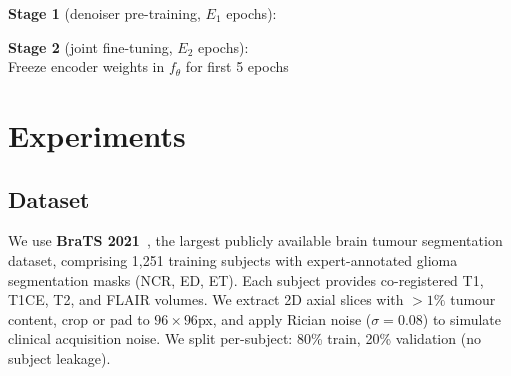 \documentclass[runningheads]{llncs}
\begin{document}
\begin{algorithm}[tb]
\SetAlgoLined
{}

\textbf{Stage 1} (denoiser pre-training, $E_1$ epochs):\\

\textbf{Stage 2} (joint fine-tuning, $E_2$ epochs):\\
Freeze encoder weights in $f_\theta$ for first 5 epochs\;
\caption{PP-MAE Two-Stage Training}
\label{alg:train}
\end{algorithm}


\section{Experiments}
\label{sec:experiments}

\subsection{Dataset}

We use \textbf{BraTS 2021}~\cite{brats2021}, the largest publicly available
brain tumour segmentation dataset, comprising 1,251 training subjects with
expert-annotated glioma segmentation masks (NCR, ED, ET).
Each subject provides co-registered T1, T1CE, T2, and FLAIR volumes.
We extract 2D axial slices with $>1\%$ tumour content,
crop or pad to $96 \times 96$px, and apply Rician noise
($\sigma = 0.08$) to simulate clinical acquisition noise.
We split per-subject: 80\% train, 20\% validation (no subject leakage).
\end{document}
